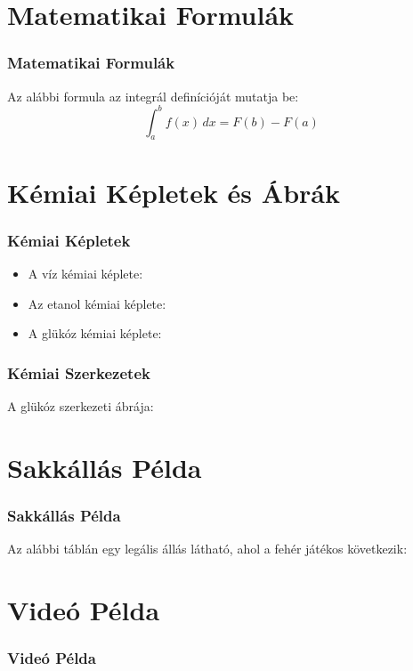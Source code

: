 \documentclass{beamer}
\begin{document}
\section{Matematikai Formulák}
\begin{frame}
    \frametitle{Matematikai Formulák}
    Az alábbi formula az integrál definícióját mutatja be:
    \begin{equation}
        \int_{a}^{b} f(x) \, dx = F(b) - F(a)
    \end{equation}
\end{frame}

\section{Kémiai Képletek és Ábrák}
\begin{frame}
    \frametitle{Kémiai Képletek}
    \begin{itemize}
        \item A víz kémiai képlete: 
        \item Az etanol kémiai képlete: 
        \item A glükóz kémiai képlete: 
    \end{itemize}
\end{frame}

\begin{frame}
    \frametitle{Kémiai Szerkezetek}
    A glükóz szerkezeti ábrája:
    \begin{center}
    \end{center}
\end{frame}

\section{Sakkállás Példa}
\begin{frame}
    \frametitle{Sakkállás Példa}
    Az alábbi táblán egy legális állás látható, ahol a fehér játékos következik:
    \begin{center}
        \chessboard[
            setpieces={
                Ke1, Qd1, Bb5, Nc3, Pd4, Pg2, Pf2, %
                pg7, ph7, kb8, qc7, bb7, ra8, pe4 %
            }
        ]
    \end{center}
\end{frame}

\section{Videó Példa}
\begin{frame}
    \frametitle{Videó Példa}
    \centering
\end{frame}
\end{document}
